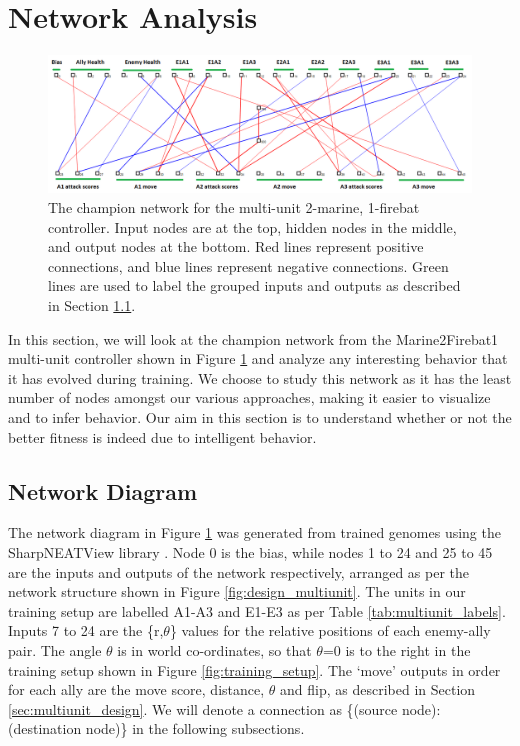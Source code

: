 \documentclass[10pt,a4paper,twocolumn]{article}
\begin{document}
\section{Network Analysis}
\label{sec:network}

\begin{figure}
\centering
\includegraphics[scale=.5]{figures/multiunit_labelled.png}
\caption{The champion network for the multi-unit 2-marine, 1-firebat controller. Input nodes are at the top, hidden nodes in the middle, and output nodes at the bottom. Red lines represent positive connections, and blue lines represent negative connections. Green lines are used to label the grouped inputs and outputs as described in Section \ref{sec:network_struct}.}
\label{fig:multiunit_mf_net}
\end{figure}

In this section, we will look at the champion network from the Marine2Firebat1 multi-unit controller shown in Figure \ref{fig:multiunit_mf_net} and analyze any interesting behavior that it has evolved during training. We choose to study this network as it has the least number of nodes amongst our various approaches, making it easier to visualize and to infer behavior. Our aim in this section is to understand whether or not the better fitness is indeed due to intelligent behavior.

\subsection{Network Diagram}
\label{sec:network_struct}

The network diagram in Figure \ref{fig:multiunit_mf_net} was generated from trained genomes using the SharpNEATView library \cite{sharpneat}. Node 0 is the bias, while nodes 1 to 24 and 25 to 45 are the inputs and outputs of the network respectively, arranged as per the network structure shown in Figure \ref{fig:design_multiunit}. The units in our training setup are labelled A1-A3 and E1-E3 as per Table \ref{tab:multiunit_labels}. Inputs 7 to 24 are the \{r,$\theta$\} values for the relative positions of each enemy-ally pair. The angle $\theta$ is in world co-ordinates, so that $\theta$=0 is to the right in the training setup shown in Figure \ref{fig:training_setup}. The `move' outputs in order for each ally are the move score, distance, $\theta$ and flip, as described in Section \ref{sec:multiunit_design}. We will denote a connection as \{(source node):(destination node)\} in the following subsections.
\end{document}
